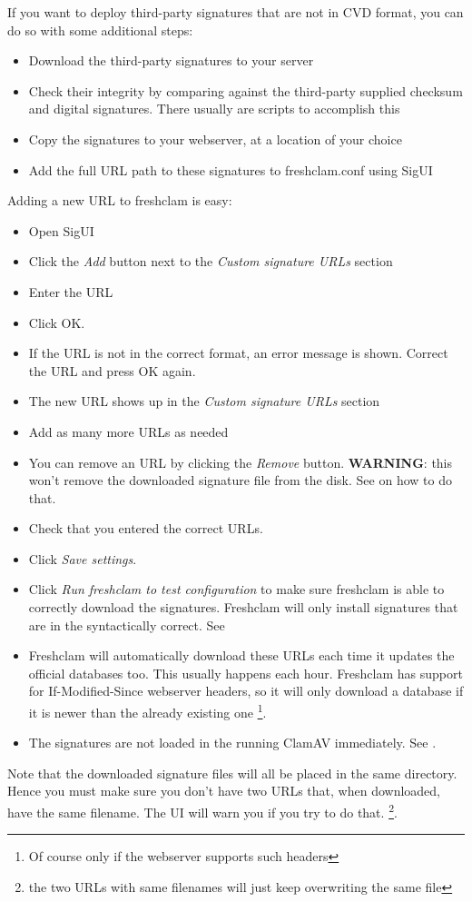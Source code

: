 If you want to deploy third-party signatures that are not in CVD format, you can do so with some additional steps:
\begin{itemize}
\item Download the third-party signatures to your server
\item Check their integrity by comparing against the third-party supplied checksum and digital signatures. There usually are scripts to accomplish this
\item Copy the signatures to your webserver, at a location of your choice
\item Add the full URL path to these signatures to \gls{freshclam.conf} using \gls{SigUI}
\end{itemize}

Adding a new URL to freshclam is easy:
\begin{itemize}
\item Open SigUI
\item Click the \emph{Add} button next to the \emph{Custom signature URLs} section
\item Enter the URL
\item Click OK.
\item If the URL is not in the correct format, an error message is shown. Correct the URL and press OK again.
\item The new URL shows up in the \emph{Custom signature URLs} section
\item Add as many more URLs as needed
\item You can remove an URL by clicking the \emph{Remove} button. \textbf{WARNING}: this won't remove the downloaded signature file from the disk. See  on how to do that.
\item Check that you entered the correct URLs.
\item Click \emph{Save settings}.
\item Click \emph{Run freshclam to test configuration} to make sure freshclam is able to correctly download the signatures. Freshclam will only install signatures that are in the syntactically correct.
See 
\item Freshclam will automatically download these URLs each time it updates the official databases too. This usually happens each hour. Freshclam has support for If-Modified-Since webserver headers, so it will only download a database if it is newer than the already existing one \footnote{Of course only if the webserver supports such headers}.
\item The signatures are not loaded in the running ClamAV immediately. See .
\end{itemize}

Note that the downloaded signature files will all be placed in the same directory. Hence you must make sure you don't have two URLs that, when downloaded, have the same filename.
The UI will warn you if you try to do that. \footnote{the two URLs with same filenames will just keep overwriting the same file}.